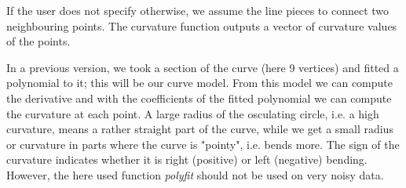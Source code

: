 

If the user does not specify otherwise, we assume the line pieces to connect two neighbouring points. The curvature function outputs a vector of curvature values of the points.




In a previous version, we  took a section of the curve (here 9 vertices) and fitted a polynomial to it; this will be our curve model. From this model we can compute the derivative and with the coefficients of the fitted polynomial we can compute the curvature at each point. 
A large radius of the osculating circle, i.e. a high curvature, means a rather straight part of the curve, while we get a small radius or curvature in parts where the curve is "pointy", i.e. bends more. The sign of the curvature indicates whether it is right (positive) or left (negative) bending. However, the here used function \textit{polyfit} should not be used on very noisy data.
%



